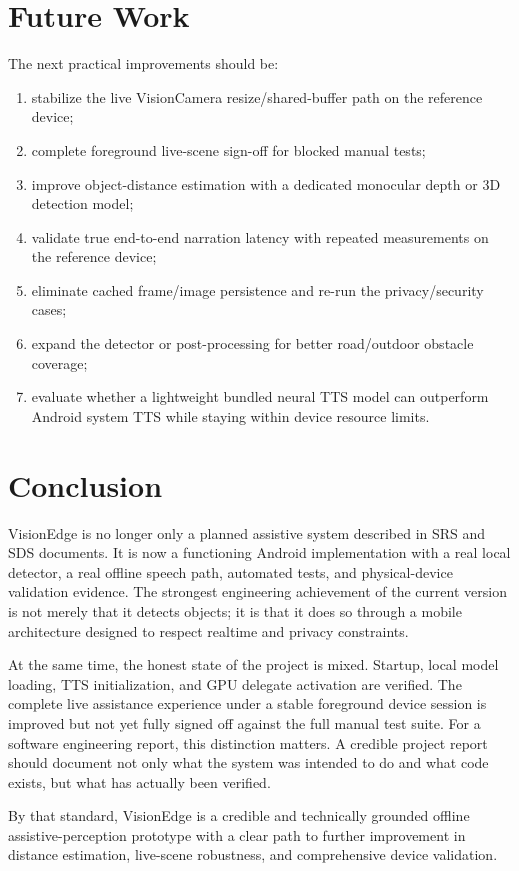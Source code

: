 \documentclass[conference]{IEEEtran}
\begin{document}
\section{Future Work}
The next practical improvements should be:
\begin{enumerate}[leftmargin=1.2em]
\item stabilize the live VisionCamera resize/shared-buffer path on the reference device;
\item complete foreground live-scene sign-off for blocked manual tests;
\item improve object-distance estimation with a dedicated monocular depth or 3D detection model;
\item validate true end-to-end narration latency with repeated measurements on the reference device;
\item eliminate cached frame/image persistence and re-run the privacy/security cases;
\item expand the detector or post-processing for better road/outdoor obstacle coverage;
\item evaluate whether a lightweight bundled neural TTS model can outperform Android system TTS while staying within device resource limits.
\end{enumerate}

\section{Conclusion}
VisionEdge is no longer only a planned assistive system described in SRS and SDS documents. It is now a functioning Android implementation with a real local detector, a real offline speech path, automated tests, and physical-device validation evidence. The strongest engineering achievement of the current version is not merely that it detects objects; it is that it does so through a mobile architecture designed to respect realtime and privacy constraints.

At the same time, the honest state of the project is mixed. Startup, local model loading, TTS initialization, and GPU delegate activation are verified. The complete live assistance experience under a stable foreground device session is improved but not yet fully signed off against the full manual test suite. For a software engineering report, this distinction matters. A credible project report should document not only what the system was intended to do and what code exists, but what has actually been verified.

By that standard, VisionEdge is a credible and technically grounded offline assistive-perception prototype with a clear path to further improvement in distance estimation, live-scene robustness, and comprehensive device validation.
\end{document}
